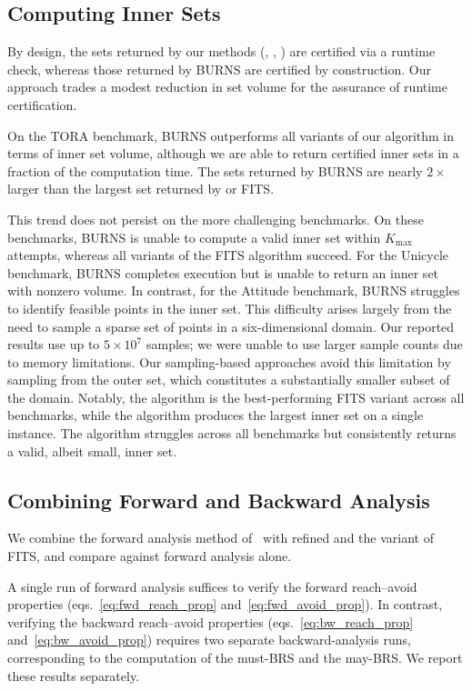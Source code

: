 \documentclass[letterpaper, 10 pt, conference]{ieeeconf}  %
\begin{document}
\subsection{Computing Inner Sets}
By design, the sets returned by our methods (\ssharp, \crisp, \clean) are certified via a runtime check, whereas those returned by BURNS are certified by construction. Our approach trades a modest reduction in set volume for the assurance of runtime certification.

On the TORA benchmark, BURNS outperforms all variants of our algorithm in terms of inner set volume, although we are able to return certified inner sets in a fraction of the computation time. The sets returned by BURNS are nearly $2\times$ larger than the largest set returned by \ssharp or FITS.

This trend does not persist on the more challenging benchmarks. On these benchmarks, BURNS is unable to compute a valid inner set within $K_{\text{max}}$ attempts, whereas all variants of the \textsc{FITS} algorithm succeed. 
For the Unicycle benchmark, BURNS completes execution but is unable to return an inner set with nonzero volume. In contrast, for the Attitude benchmark, BURNS struggles to identify feasible points in the inner set. This difficulty arises largely from the need to sample a sparse set of points in a six-dimensional domain. Our reported results use up to $5 \times 10^{7}$ samples; we were unable to use larger sample counts due to memory limitations.
Our sampling-based approaches avoid this limitation by sampling from the outer set, which constitutes a substantially smaller subset of the domain. Notably, the \crisp algorithm is the best-performing \textsc{FITS} variant across all benchmarks, while the \clean algorithm produces the largest inner set on a single instance. The \ssharp algorithm struggles across all benchmarks but consistently returns a valid, albeit small, inner set.

\subsection{Combining Forward and Backward Analysis}
We combine the forward analysis method of~\cite{akinwande2025verifying} with refined \dripy and the \crisp variant of \textsc{FITS}, and compare against forward analysis alone.

A single run of forward analysis suffices to verify the forward reach--avoid properties (eqs.~\eqref{eq:fwd_reach_prop} and~\eqref{eq:fwd_avoid_prop}). In contrast, verifying the backward reach--avoid properties (eqs.~\eqref{eq:bw_reach_prop} and~\eqref{eq:bw_avoid_prop}) requires two separate backward-analysis runs, corresponding to the computation of the must-BRS and the may-BRS. We report these results separately.
\end{document}
